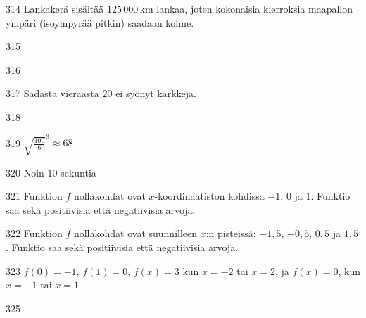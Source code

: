 \begin{Vastaus}{314}
Lankakerä sisältää $125\,000$\,km lankaa, joten kokonaisia kierroksia maapallon ympäri (isoympyrää pitkin) saadaan kolme.
	
\end{Vastaus}
\begin{Vastaus}{315}
	
\end{Vastaus}
\begin{Vastaus}{316}
	
\end{Vastaus}
\begin{Vastaus}{317}
		Sadasta vieraasta $20$ ei syönyt karkkeja.
	
\end{Vastaus}
\begin{Vastaus}{318}
	
\end{Vastaus}
\begin{Vastaus}{319}
		${\sqrt{\frac{100}{6}}}^{3} \approx 68$
	
\end{Vastaus}
\begin{Vastaus}{320}
        Noin $10$ sekuntia
    
\end{Vastaus}
\begin{Vastaus}{321}
Funktion $f$ nollakohdat ovat $x$-koordinaatiston kohdissa $-1$, $0$ ja $1$. Funktio saa sekä positiivisia että negatiivisia arvoja.
\end{Vastaus}
\begin{Vastaus}{322}
Funktion $f$ nollakohdat ovat suunnilleen $x$:n pisteissä: $-1,5$, $-0,5$, $0,5$ ja $1,5$. Funktio saa sekä positiivisia että negatiivisia arvoja.
	
\end{Vastaus}
\begin{Vastaus}{323}
 $f(0)=-1$, $f(1)=0$, $f(x)=3$ kun $x=-2$ tai $x=2$, ja $f(x)=0$, kun $x=-1$ tai $x=1$
\end{Vastaus}
\begin{Vastaus}{325}
  
\end{Vastaus}
